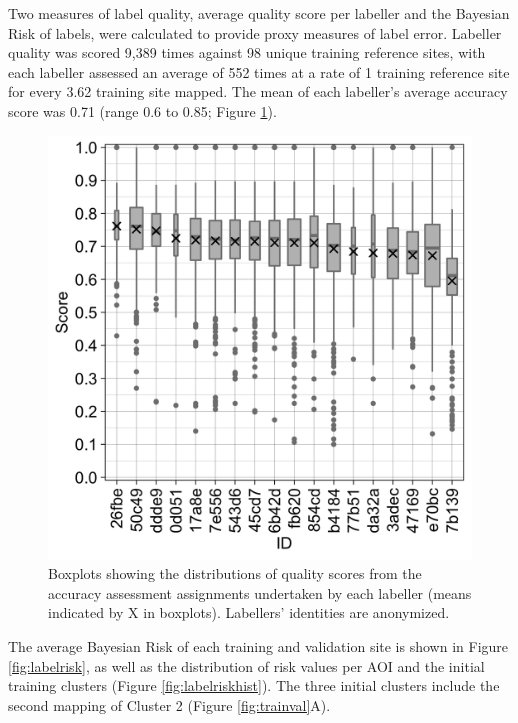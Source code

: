 \documentclass[
  11pt,
  a4paper]{article}
\begin{document}
Two measures of label quality, average quality score per labeller and
the Bayesian Risk of labels, were calculated to provide proxy measures
of label error. Labeller quality was scored 9,389 times against 98
unique training reference sites, with each labeller assessed an average
of 552 times at a rate of 1 training reference site for every 3.62
training site mapped. The mean of each labeller's average accuracy score
was 0.71 (range 0.6 to 0.85; Figure \ref{fig:labelqual}).

\begin{figure}[!ht]

{\centering \includegraphics[width=0.7\linewidth,]{figures/si_label_quality} 

}

\caption{Boxplots showing the distributions of quality scores from the accuracy assessment assignments undertaken by each labeller (means indicated by X in boxplots). Labellers' identities are anonymized.}\label{fig:labelqual}
\end{figure}

The average Bayesian Risk of each training and validation site is shown
in Figure \ref{fig:labelrisk}, as well as the distribution of risk
values per AOI and the initial training clusters (Figure
\ref{fig:labelriskhist}). The three initial clusters include the second
mapping of Cluster 2 (Figure \ref{fig:trainval}A).
\end{document}

